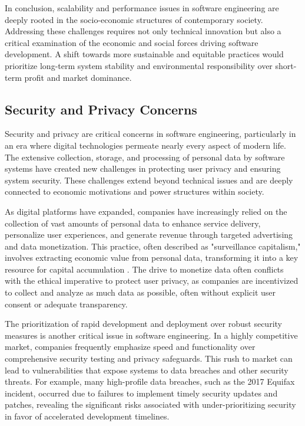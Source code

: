 \begin{refsection}
In conclusion, scalability and performance issues in software engineering are deeply rooted in the socio-economic structures of contemporary society. Addressing these challenges requires not only technical innovation but also a critical examination of the economic and social forces driving software development. A shift towards more sustainable and equitable practices would prioritize long-term system stability and environmental responsibility over short-term profit and market dominance.

\subsection{Security and Privacy Concerns}

Security and privacy are critical concerns in software engineering, particularly in an era where digital technologies permeate nearly every aspect of modern life. The extensive collection, storage, and processing of personal data by software systems have created new challenges in protecting user privacy and ensuring system security. These challenges extend beyond technical issues and are deeply connected to economic motivations and power structures within society.

As digital platforms have expanded, companies have increasingly relied on the collection of vast amounts of personal data to enhance service delivery, personalize user experiences, and generate revenue through targeted advertising and data monetization. This practice, often described as "surveillance capitalism," involves extracting economic value from personal data, transforming it into a key resource for capital accumulation \cite[pp.~55-58]{zuboff2020age}. The drive to monetize data often conflicts with the ethical imperative to protect user privacy, as companies are incentivized to collect and analyze as much data as possible, often without explicit user consent or adequate transparency.

The prioritization of rapid development and deployment over robust security measures is another critical issue in software engineering. In a highly competitive market, companies frequently emphasize speed and functionality over comprehensive security testing and privacy safeguards. This rush to market can lead to vulnerabilities that expose systems to data breaches and other security threats. For example, many high-profile data breaches, such as the 2017 Equifax incident, occurred due to failures to implement timely security updates and patches, revealing the significant risks associated with under-prioritizing security in favor of accelerated development timelines.


\end{refsection}
